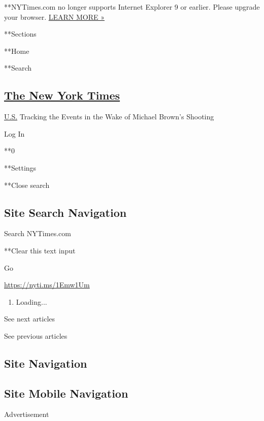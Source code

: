  **NYTimes.com no longer supports Internet Explorer 9 or earlier. Please
upgrade your browser.
\href{http://www.nytimes.com/content/help/site/ie9-support.html}{LEARN
MORE »}

**Sections

**Home

**Search

\hypertarget{the-new-york-times}{%
\subsection{\texorpdfstring{\href{http://www.nytimes.com/}{The New York
Times}}{The New York Times}}\label{the-new-york-times}}

 \href{https://www.nytimes.com/section/us}{U.S.} \textbar{}Tracking the
Events in the Wake of Michael Brown's Shooting

Log In

**0

**Settings

**Close search

\hypertarget{site-search-navigation}{%
\subsection{Site Search Navigation}\label{site-search-navigation}}

Search NYTimes.com

**Clear this text input

Go

\url{https://nyti.ms/1Emw1Um}

\begin{enumerate}
\def\labelenumi{\arabic{enumi}.}
\item
  Loading...
\end{enumerate}

See next articles

See previous articles

\hypertarget{site-navigation}{%
\subsection{Site Navigation}\label{site-navigation}}

\hypertarget{site-mobile-navigation}{%
\subsection{Site Mobile Navigation}\label{site-mobile-navigation}}

Advertisement

